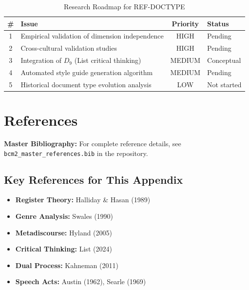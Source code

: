 \begin{table}[htbp]
\centering
\caption{Research Roadmap for REF-DOCTYPE}
\label{tab:doctype-theory-roadmap}
\renewcommand{\arraystretch}{1.3}
\begin{tabular}{@{}clcl@{}}
\toprule
\textbf{\#} & \textbf{Issue} & \textbf{Priority} & \textbf{Status} \\
\midrule
1 & Empirical validation of dimension independence & HIGH & Pending \\
2 & Cross-cultural validation studies & HIGH & Pending \\
3 & Integration of $D_9$ (List critical thinking) & MEDIUM & Conceptual \\
4 & Automated style guide generation algorithm & MEDIUM & Pending \\
5 & Historical document type evolution analysis & LOW & Not started \\
\bottomrule
\end{tabular}
\end{table}


\section{References}
\label{sec:doctype-theory-references}

\begin{tcolorbox}[colback=blue!5!white, colframe=blue!75!black]
\textbf{Master Bibliography:} For complete reference details, see
\texttt{bcm2\_master\_references.bib} in the repository.
\end{tcolorbox}

\subsection{Key References for This Appendix}

\begin{itemize}[nosep]
    \item \textbf{Register Theory:} Halliday \& Hasan (1989)
    \item \textbf{Genre Analysis:} Swales (1990)
    \item \textbf{Metadiscourse:} Hyland (2005)
    \item \textbf{Critical Thinking:} List (2024)
    \item \textbf{Dual Process:} Kahneman (2011)
    \item \textbf{Speech Acts:} Austin (1962), Searle (1969)
\end{itemize}

